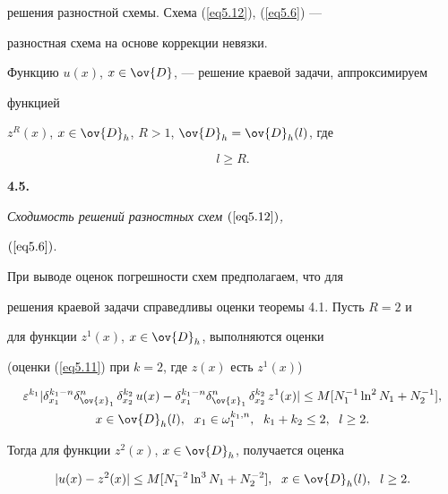 решения разностной схемы. Схема (\ref{eq5.12}), (\ref{eq5.6}) ---


разностная схема на основе коррекции невязки.





Функцию $u(x)$, $x\in\ov{D}$, --- решение краевой задачи, аппроксимируем 


функцией


$z^R(x)$, $x\in \ov{D}_h$, $R>1$, $\ov{D}_h=\ov{D}_h(l)$, где


\begin{equation}


\label{eq5.13}


l\ge R.


\end{equation}





{\bf 4.5.} {\it Сходимость решений разностных схем $(\ref{eq5.12})$,


$(\ref{eq5.6})$.}


При выводе оценок погрешности схем предполагаем, что для


решения краевой задачи справедливы оценки теоремы 4.1. Пусть $R=2$ и


для функции $z^1(x)$, $x\in\ov{D}_h$, выполняются оценки


(оценки (\ref{eq5.11}) при $k=2$, где $z(x)$ есть $z^1(x)$)


\begin{gather}


\label{eq5.14}


\eps^{k_1}|\delta_{x_1}^{k_1-n}\delta^n_{\ov{x}_1}\,\delta^{k_2}_{x_2}\,u(x)-


\delta_{x_1}^{k_1-n}\delta^n_{\ov{x}_1}\,\delta^{k_2}_{x_2}\,z^1(x)|\le


M[N_1^{-1}\ln^2 N_1+N_2^{-1}],\\


x\in\ov{D}_h(l),\ \; x_1\in\omega_1^{k_1,n},\ \;  k_1+k_2\le 2,


\ \; l\ge 2.\notag


\end{gather}


Тогда для функции $z^2(x)$, $x\in\ov{D}_h$, получается оценка


\begin{equation}


\label{eq5.15}


|u(x)-z^2(x)|\le M[N_1^{-2}\ln^3 N_1+N_2^{-2}],\ \;


x\in\ov{D}_h(l),\ \; l\ge 2.


\end{equation}





